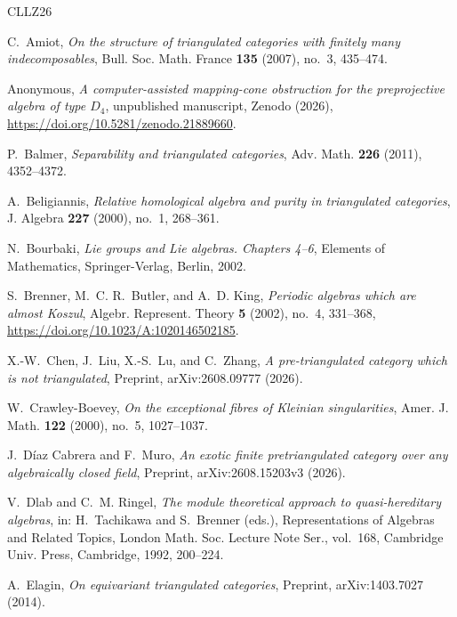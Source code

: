 \documentclass[a4paper,11pt,reqno]{amsart}
\theoremstyle{definition}
\theoremstyle{plain}
\numberwithin{equation}{section}
\begin{document}
\begin{thebibliography}{CLLZ26}
\setlength{\itemsep}{0pt}

C.~Amiot,
\emph{On the structure of triangulated categories with finitely many
indecomposables},
Bull. Soc. Math. France \textbf{135} (2007), no.~3, 435--474.

Anonymous,
\emph{A computer-assisted mapping-cone obstruction for the preprojective
algebra of type \(D_4\)},
unpublished manuscript, Zenodo (2026),
\url{https://doi.org/10.5281/zenodo.21889660}.

P.~Balmer,
\emph{Separability and triangulated categories},
Adv. Math. \textbf{226} (2011), 4352--4372.

A.~Beligiannis,
\emph{Relative homological algebra and purity in triangulated categories},
J. Algebra \textbf{227} (2000), no.~1, 268--361.

N.~Bourbaki,
\emph{Lie groups and Lie algebras. Chapters 4--6},
Elements of Mathematics, Springer-Verlag, Berlin, 2002.

S.~Brenner, M.~C. R.~Butler, and A.~D. King,
\emph{Periodic algebras which are almost Koszul},
Algebr. Represent. Theory \textbf{5} (2002), no.~4, 331--368,
\url{https://doi.org/10.1023/A:1020146502185}.

X.-W.~Chen, J.~Liu, X.-S.~Lu, and C.~Zhang,
\emph{A pre-triangulated category which is not triangulated},
Preprint, arXiv:2608.09777 (2026).

W.~Crawley-Boevey,
\emph{On the exceptional fibres of Kleinian singularities},
Amer. J. Math. \textbf{122} (2000), no.~5, 1027--1037.

J.~D\'iaz Cabrera and F.~Muro,
\emph{An exotic finite pretriangulated category over any algebraically closed field},
Preprint, arXiv:2608.15203v3 (2026).

V.~Dlab and C.~M. Ringel,
\emph{The module theoretical approach to quasi-hereditary algebras},
in: H.~Tachikawa and S.~Brenner (eds.), Representations of Algebras and
Related Topics, London Math. Soc. Lecture Note Ser., vol.~168,
Cambridge Univ. Press, Cambridge, 1992, 200--224.

A.~Elagin,
\emph{On equivariant triangulated categories},
Preprint, arXiv:1403.7027 (2014).


\end{thebibliography}
\end{document}
